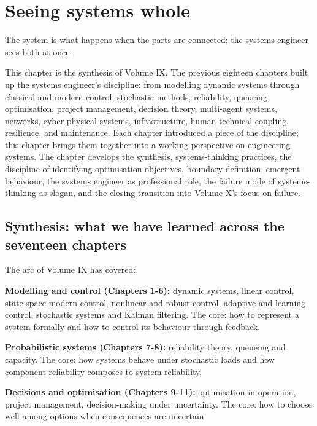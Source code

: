 \chapter{Seeing systems whole}
\label{vol09:ch19}

\epigraph{The system is what happens when the parts are connected; the systems engineer sees both at once.}{}


\noindent
This chapter is the synthesis of Volume IX. The previous eighteen chapters built up the systems engineer's discipline: from modelling dynamic systems through classical and modern control, stochastic methods, reliability, queueing, optimisation, project management, decision theory, multi-agent systems, networks, cyber-physical systems, infrastructure, human-technical coupling, resilience, and maintenance. Each chapter introduced a piece of the discipline; this chapter brings them together into a working perspective on engineering systems. The chapter develops the synthesis, systems-thinking practices, the discipline of identifying optimisation objectives, boundary definition, emergent behaviour, the systems engineer as professional role, the failure mode of systems-thinking-as-slogan, and the closing transition into Volume X's focus on failure.

\section{Synthesis: what we have learned across the seventeen chapters}

The arc of Volume IX has covered:

\textbf{Modelling and control (Chapters 1-6):} dynamic systems, linear control, state-space modern control, nonlinear and robust control, adaptive and learning control, stochastic systems and Kalman filtering. The core: how to represent a system formally and how to control its behaviour through feedback.

\textbf{Probabilistic systems (Chapters 7-8):} reliability theory, queueing and capacity. The core: how systems behave under stochastic loads and how component reliability composes to system reliability.

\textbf{Decisions and optimisation (Chapters 9-11):} optimisation in operation, project management, decision-making under uncertainty. The core: how to choose well among options when consequences are uncertain.

